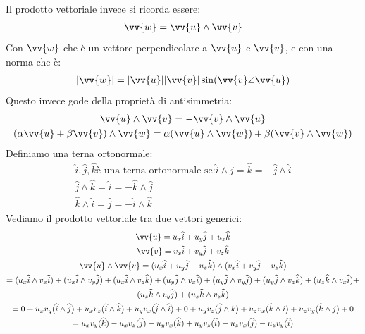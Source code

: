\documentclass[a4paper, oneside]{article}
\begin{document}
Il prodotto vettoriale invece si ricorda essere:
\begin{gather*}
    \vv{w} = \vv{u} \land \vv{v}
\end{gather*}
Con $\vv{w}$ che è un vettore perpendicolare a $\vv{u}$ e $\vv{v}$, e con una norma che è:
\begin{gather*}
    |\vv{w}| = |\vv{u}| |\vv{v}| \sin(\vv{v} \angle \vv{u})
\end{gather*}
Questo invece gode della proprietà di antisimmetria:
\begin{gather*}
    \vv{u} \land \vv{v} = - \vv{v} \land \vv{u}\\
    (\alpha \vv{u} + \beta \vv{v}) \land \vv{w} = \alpha (\vv{u} \land \vv{w}) + \beta (\vv{v} \land \vv{w})
\end{gather*}
Definiamo una terna ortonormale:
\begin{gather*}
    {\widehat{i}, \widehat{j}, \widehat{k}} \text{è una terna ortonormale se:}
    \widehat{i} \land \widehat{j} = \widehat{k} = -\widehat{j} \land \widehat{i}\\
    \widehat{j} \land \widehat{k} = \widehat{i} = -\widehat{k} \land \widehat{j}\\
    \widehat{k} \land \widehat{i} = \widehat{j} = -\widehat{i} \land \widehat{k}
\end{gather*}
Vediamo il prodotto vettoriale tra due vettori generici:
\begin{gather*}
    \vv{u} = u_x \widehat{i} + u_y \widehat{j} + u_z \widehat{k}\\
    \vv{v} = v_x \widehat{i} + v_y \widehat{j} + v_z \widehat{k}\\
    \vv{u} \land \vv{v} = (u_x \widehat{i} + u_y \widehat{j} + u_z \widehat{k}) \land (v_x \widehat{i} + v_y \widehat{j} + v_z \widehat{k})\\
    = (u_x \widehat{i} \land v_x \widehat{i}) + (u_x \widehat{i} \land v_y \widehat{j}) + (u_x \widehat{i} \land v_z \widehat{k}) + (u_y \widehat{j} \land v_x \widehat{i}) + (u_y \widehat{j} \land v_y \widehat{j}) + (u_y \widehat{j} \land v_z \widehat{k}) + (u_z \widehat{k} \land v_x \widehat{i}) + \\(u_z \widehat{k} \land v_y \widehat{j}) + (u_z \widehat{k} \land v_z \widehat{k})\\
    = 0 + u_x v_y (\widehat{i} \land \widehat{j}) + u_x v_z (\widehat{i} \land \widehat{k}) + u_y v_x (\widehat{j} \land \widehat{i}) + 0 + u_y v_z (\widehat{j} \land k) + u_z v_x (\widehat{k} \land i) + u_z v_y (\widehat{k} \land j) + 0\\
    = u_x v_y (\widehat{k}) - u_x v_z (\widehat{j}) - u_y v_x (\widehat{k}) + u_y v_z (\widehat{i}) - u_z v_x (\widehat{j}) - u_z v_y (\widehat{i})
\end{gather*}
\end{document}
